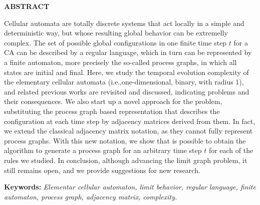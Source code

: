 \documentclass[12pt,a4paper]{article}
\begin{document}
\newpage
\thispagestyle{plain}
\begin{center}
\large
\textbf{ABSTRACT}
\end{center}
\renewcommand{\baselinestretch}{0.6666666}
Cellular automata are totally discrete systems that act locally in
a simple and deterministic way, but whose resulting global behavior  can
be extremelly complex. The set of possible global configurations in
one finite time step $t$ for a CA can be described by a regular language,
which in turn can be represented by a finite automaton, more precisely
the so-called process graphs,
in which all states are initial and final. Here, we study the
temporal evolution complexity of the elementary cellular automata
(i.e.,one-dimensional, binary, with radius 1), and related previous works
are revisited and discussed, indicating problems and their consequences.
We also start up a novel approach for the problem, substituting the process
graph based representation that describes the configuration at each time step by
adjacency matrices derived from them. In fact, we extend the classical
adjacency matrix notation, as they cannot fully represent process graphs.
With this new notation, we show that is possible to obtain the algorithm
to generate a process graph for an arbitrary time step $t$ for each
of the rules we studied. In conclusion, although advancing
the limit graph problem, it still remains open, and we provide suggestions for
new research.
\\[0.5cm]
\begin{flushleft}
{\bf Keywords:} {\it Elementar cellular automaton, limit behavior,
regular language, finite automaton, process graph,
adjacency matrix, complexity.}
\end{flushleft}
\end{document}
